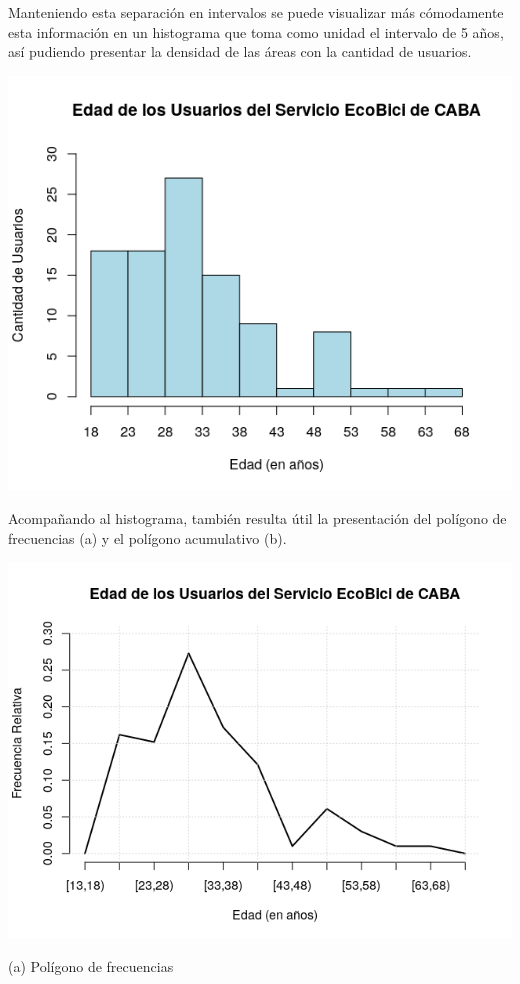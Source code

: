 \documentclass[11pt]{article}
\begin{document}
    Manteniendo esta separaci\'on en intervalos se puede visualizar m\'as c\'omodamente esta informaci\'on en un histograma
    que toma como unidad el intervalo de 5 a\~{n}os, as\'i pudiendo presentar la densidad de las \'areas con
    la cantidad de usuarios.

    \hspace{7mm}\includegraphics[scale=0.7]{NewHistEdad2.png}

    Acompañando al histograma, tambi\'en resulta \'util la presentaci\'on del pol\'igono de frecuencias (a) y el pol\'igono acumulativo (b).

    \begin{center}
    \includegraphics[scale=0.55]{PoligFrecEdad.png}
    \vspace{-4mm}

    (a) Pol\'igono de frecuencias
    \end{center}
\end{document}
